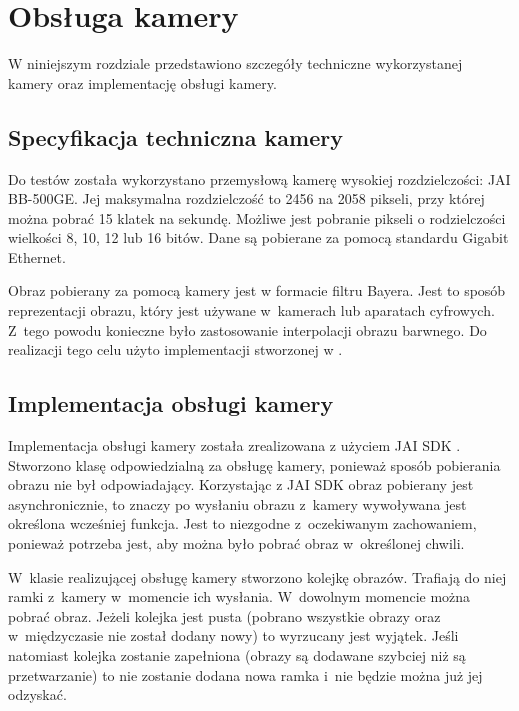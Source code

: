 \chapter{Obsługa kamery}
\label{cha:obslugakamery}

W niniejszym rozdziale przedstawiono szczegóły techniczne wykorzystanej kamery oraz implementację obsługi kamery.

\section{Specyfikacja techniczna kamery}
\label{sec:specyfikacjaKamery}

Do testów została wykorzystano przemysłową kamerę wysokiej rozdzielczości: JAI BB-500GE. Jej maksymalna rozdzielczość to 2456 na 2058 pikseli, przy której można pobrać 15 klatek na sekundę. Możliwe jest pobranie pikseli o rodzielczości wielkości 8, 10, 12 lub 16 bitów. Dane są pobierane za pomocą standardu Gigabit Ethernet. 

Obraz pobierany za pomocą kamery jest w formacie filtru Bayera. Jest to sposób reprezentacji obrazu, który jest używane w~kamerach lub aparatach cyfrowych. Z~tego powodu konieczne było zastosowanie interpolacji obrazu barwnego. Do realizacji tego celu użyto implementacji stworzonej w \cite{BFIOCL}.

\section{Implementacja obsługi kamery}
\label{sec:implementacjaKamery}

Implementacja obsługi kamery została zrealizowana z użyciem JAI SDK \cite{JAISDK}. Stworzono klasę odpowiedzialną za obsługę kamery, ponieważ sposób pobierania obrazu nie był odpowiadający. Korzystając z JAI SDK obraz pobierany jest asynchronicznie, to znaczy po wysłaniu obrazu z~kamery wywoływana jest określona wcześniej funkcja. Jest to niezgodne z~oczekiwanym zachowaniem, ponieważ potrzeba jest, aby można było pobrać obraz w~określonej chwili.

W~klasie realizującej obsługę kamery stworzono kolejkę obrazów. Trafiają do niej ramki z~kamery w~momencie ich wysłania. W~dowolnym momencie można pobrać obraz. Jeżeli kolejka jest pusta (pobrano wszystkie obrazy oraz w~międzyczasie nie został dodany nowy) to wyrzucany jest wyjątek. Jeśli natomiast kolejka zostanie zapełniona (obrazy są dodawane szybciej niż są przetwarzanie) to nie zostanie dodana nowa ramka i~nie będzie można już jej odzyskać.
